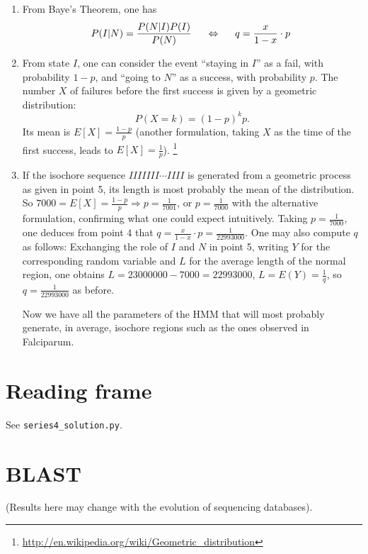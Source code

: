 \documentclass[a4paper,11pt]{article}
\begin{document}
\begin{enumerate}
\item From Baye's Theorem, one has
\begin{equation*}
P(I | N) = \frac{P(N | I) P(I)}{P(N)} \hspace{5mm} \Leftrightarrow \hspace{5mm} q = \frac{x}{1-x} \cdot p~
\end{equation*}
\item From state $I$, one can consider the event ``staying in $I$'' as a fail, with probability $1-p$, and ``going to $N$'' as a success, with probability $p$. The number $X$ of failures before the first success is given by a geometric distribution:
$$ P(X=k) = (1-p)^k p .$$
Its mean is $E[X] = \frac{1-p}{p}$ (another formulation, taking $X$ as the time of the first success, leads to $E[X] = \frac{1}{p}$).
\footnote{\url{http://en.wikipedia.org/wiki/Geometric_distribution}}
\item If the isochore sequence $IIIIIII \cdots IIII$ is generated from a geometric process as given in point 5, its length is most probably the mean of the distribution. So $7000 = E[X] = \frac{1-p}{p} \Rightarrow p = \frac{1}{7001}$, or $p=\frac{1}{7000}$ with the alternative formulation, confirming what one could expect intuitively. Taking $p=\frac{1}{7000}$, one deduces from point 4 that $q = \frac{x}{1-x} \cdot p = \frac{1}{22993000}$. One may also compute $q$ as follows: Exchanging the role of $I$ and $N$ in point 5, writing $Y$ for the corresponding random variable and $L$ for the average length of the normal region, one obtains $L= 23000000-7000 = 22993000$, $L = E(Y) =  \frac{1}{q}$, so $q = \frac{1}{22993000}$ as before.

Now we have all the parameters of the HMM that will most probably generate, in average, isochore regions such as the ones observed in Falciparum.
\end{enumerate}

\section{Reading frame}

See \texttt{series4\_solution.py}.

\section{BLAST}

(Results here may change with the evolution of sequencing databases).
\end{document}
